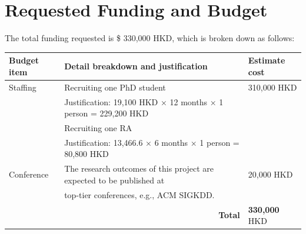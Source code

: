 \documentclass[12pt,a4paper]{article}
\begin{document}
\section{Requested Funding and Budget}
\vspace{-10pt}
The total funding requested is \$ 330,000 HKD, which is broken down as follows:
\vspace{-6pt}
\begin{table}[h!]
\centering
\begin{tabular}{|l|l|l|}
\hline
\textbf{Budget item} & \textbf{Detail breakdown and justification} & \textbf{Estimate cost} \\
\hline
Staffing & Recruiting one PhD student & 310,000 HKD\\

& Justification: 19,100 HKD × 12 months × 1 person = 229,200 HKD &  \\
& Recruiting one RA &  \\
& Justification: 13,466.6 × 6 months × 1 person = 80,800 HKD &  \\
 \hline
Conference & The research outcomes of this project are expected to be published at & 20,000 HKD \\
& top-tier conferences, e.g., ACM SIGKDD. &  \\
 \hline
\multicolumn{2}{|r|}{\textbf{Total}}   & \textbf{330,000} HKD \\
 \hline
\end{tabular}
\vspace{-20pt}
\end{table}


    
    
\end{document}
